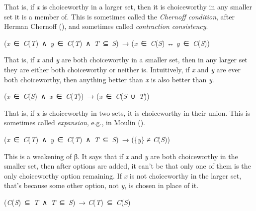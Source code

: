 \documentclass[
  11pt,
  letterpaper,
  DIV=11,
  numbers=noendperiod,
  twoside]{scrartcl}
\providecommand{\tightlist}{%
  \setlength{\itemsep}{0pt}\setlength{\parskip}{0pt}}
\begin{document}
That is, if \emph{x} is choiceworthy in a larger set, then it is
choiceworthy in any smaller set it is a member of. This is sometimes
called the \emph{Chernoff condition}, after Herman Chernoff
(), and sometimes called
\emph{contraction consistency}.

\begin{description}
\tightlist
\item[Property β]
(\emph{x}~∈~\emph{C}(\emph{T})~∧~\emph{y}~∈~\emph{C}(\emph{T})~∧~\emph{T}~⊆~\emph{S})~→
(\emph{x}~∈~\emph{C}(\emph{S}) ↔ \emph{y}~∈~\emph{C}(\emph{S}))
\end{description}

That is, if \emph{x} and \emph{y} are both choiceworthy in a smaller
set, then in any larger set they are either both choiceworthy or neither
is. Intuitively, if \emph{x} and \emph{y} are ever both choiceworthy,
then anything better than \emph{x} is also better than \emph{y}.

\begin{description}
\tightlist
\item[Property γ]
(\emph{x}~∈~\emph{C}(\emph{S})~∧~\emph{x}~∈~\emph{C}(\emph{T}))~→
(\emph{x}~∈~\emph{C}(\emph{S}~∪~\emph{T}))
\end{description}

That is, if \emph{x} is choiceworthy in two sets, it is choiceworthy in
their union. This is sometimes called \emph{expansion}, e.g., in Moulin
().

\begin{description}
\tightlist
\item[Property δ]
(\emph{x}~∈~\emph{C}(\emph{T})~∧~\emph{y}~∈~\emph{C}(\emph{T})~∧~\emph{T}~⊆~\emph{S})~→
(\{\emph{y}\} ≠ \emph{C}(\emph{S}))
\end{description}

This is a weakening of β. It says that if \emph{x} and \emph{y} are both
choiceworthy in the smaller set, then after options are added, it can't
be that only one of them is the only choiceworthy option remaining. If
\emph{x} is not choiceworthy in the larger set, that's because some
other option, not \emph{y}, is chosen in place of it.

\begin{description}
\tightlist
\item[Property Aiz]
(\emph{C}(\emph{S})~⊆~\emph{T}~∧~\emph{T}~⊆~\emph{S})~→
\emph{C}(\emph{T})~⊆~\emph{C}(\emph{S})
\end{description}
\end{document}
